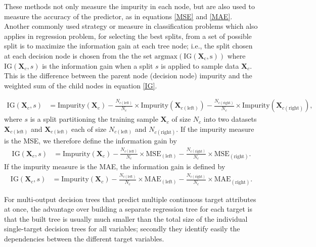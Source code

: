 These methods not only measure the impurity in each node, but are also used to measure the accuracy of the predictor, as in equations \ref{MSE} and \ref{MAE}. Another commonly used strategy or measure in classification problems which also applies in regression problem, for selecting the best splits, from a set of possible split is to maximize the information gain at each tree node; i.e., the split chosen at each decision node is chosen from the the set $\mathrm{argmax (IG(\textbf{X}_{c},s))}$ where $\mathrm{IG}(\textbf{X}_{c},s)$ is the information gain when a split $s$ is applied to sample data $\textbf{X}_c$. This is the difference between the parent node (decision node) impurity and the weighted sum of the child nodes in equation \ref{IG}. 
 
 \begin{align}
 \mathrm{IG}(\textbf{X}_c,s)&= \mathrm{Impurity}(\textbf{X}_c)-\frac{N_{c(\mathrm{left})}}{N_c}\times \mathrm{Impurity}(\textbf{X}_{c(\mathrm{left})})- \frac{N_{c(\mathrm{right})}}{N_c}\times \mathrm{Impurity} (\textbf{X}_{c(\mathrm{right})}), \label{IG}
 \end{align}
 where $s$ is a split partitioning the training sample $\textbf{X}_c$ of size $N_c$ into two datasets $\textbf{X}_{c(\mathrm{left})}$ and $\textbf{X}_{c(\mathrm{left})}$ each of size $N_{c(\mathrm{left})}$ and $N_{c(\mathrm{right})}$.
If the impurity measure is the MSE, we therefore define the information gain by
 \begin{align}
 \mathrm{IG}(\textbf{X}_c,s)&= \mathrm{Impurity}(\textbf{X}_c)-\frac{N_{c(\mathrm{left})}}{N_c}\times \text{MSE}_{(\mathrm{left})}- \frac{N_{c(\mathrm{right})}}{N_c}\times \text{MSE}_{(\mathrm{right})}.
  \end{align}
If the impurity measure is the MAE, the information gain is defined by   
 \begin{align}
 \mathrm{IG}(\textbf{X}_c,s)&= \mathrm{Impurity}(\textbf{X}_c)-\frac{N_{c(\mathrm{left})}}{N_c}\times \text{MAE}_{(\mathrm{left})}- \frac{N_{c(\mathrm{right})}}{N_c}\times \text{MAE}_{(\mathrm{right})}. 
 \end{align}
 
For multi-output decision trees that predict multiple continuous target attributes at once, the advantage over building a separate
regression tree for each target is that the built tree is usually much smaller than the total size of the individual single-target decision trees for all variables; secondly they  identify easily the dependencies between the different target variables.

